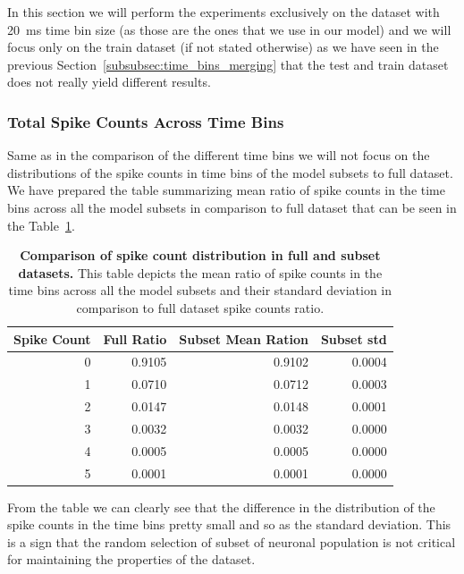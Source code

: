 In this section we will perform the experiments exclusively on the dataset with 20~ms time bin size (as those are the ones that we use in our model) and we will focus only on the train dataset (if not stated otherwise) as we have seen  in the previous Section~\ref{subsubsec:time_bins_merging} that the test and train dataset does not really yield different results. 

\subsubsection{Total Spike Counts Across Time Bins}
\label{subsubsec:total_spike_counts_subset}
Same as in the comparison of the different time bins we will not focus on the distributions of the spike counts in time bins of the model subsets to full dataset. We have prepared the table summarizing mean ratio of spike counts in the time bins across all the model subsets in comparison to full dataset that can be seen in the Table~\ref{tab:subset_spike_count_distribution}.

\begin{table}
    \centering\footnotesize\sf
    \begin{tabular}{rrrr}
        \toprule
        Spike Count & Full Ratio & Subset Mean Ration & Subset std \\
        \midrule
        0 & 0.9105 & 0.9102 & 0.0004 \\
        1 & 0.0710 & 0.0712 & 0.0003 \\
        2 & 0.0147 & 0.0148 & 0.0001 \\
        3 & 0.0032 & 0.0032 & 0.0000 \\
        4 & 0.0005 & 0.0005 & 0.0000 \\
        5 & 0.0001 & 0.0001 & 0.0000 \\
        \bottomrule
    \end{tabular}
    \caption{\textbf{Comparison of spike count distribution in full and subset datasets.} This table depicts the mean ratio of spike counts in the time bins across all the model subsets and their standard deviation in comparison to full dataset spike counts ratio.}
    \label{tab:subset_spike_count_distribution}
\end{table}

From the table we can clearly see that the difference in the distribution of the spike counts in the time bins pretty small and so as the standard deviation. This is a sign that the random selection of subset of neuronal population is not critical for maintaining the properties of the dataset.


